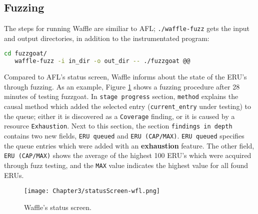 
\subsection{Fuzzing}

The steps for running Waffle are similiar to AFL; \texttt{./waffle-fuzz} gets the input and output directories, in addition to the instrumentated program:

\begin{lstlisting}[language=bash,style=CommandStyle,label={lst:wafl-fuzzgoat-fuzz}]
   cd fuzzgoat/
   waffle-fuzz -i in_dir -o out_dir -- ./fuzzgoat @@
\end{lstlisting}

Compared to AFL's status screen, Waffle informs about the state of the ERU's through fuzzing. As an example, Figure \ref{fig:status-wfl} shows a fuzzing procedure after 28 minutes of testing fuzzgoat. In \texttt{stage progress} section, \texttt{method} explains the causal method which added the selected entry (\texttt{current\_entry} under testing) to the queue; either it is discovered as a \texttt{Coverage} finding, or it is caused by a resource \texttt{Exhaustion}. Next to this section, the section \texttt{findings in depth} contains two new fields, \texttt{ERU queued} and \texttt{ERU (CAP/MAX)}. \texttt{ERU queued} specifies the queue entries which were added with an \textbf{exhaustion} feature. The other field, \texttt{ERU (CAP/MAX)} shows the average of the highest 100 ERU's which were acquired through fuzz testing, and the \texttt{MAX} value indicates the highest value for all found ERUs. 

\begin{figure}[!b]
   \texttt{[image: Chapter3/statusScreen-wfl.png]}
   \centering
   \caption{Waffle's status screen.}
   \label{fig:status-wfl}
\end{figure}
